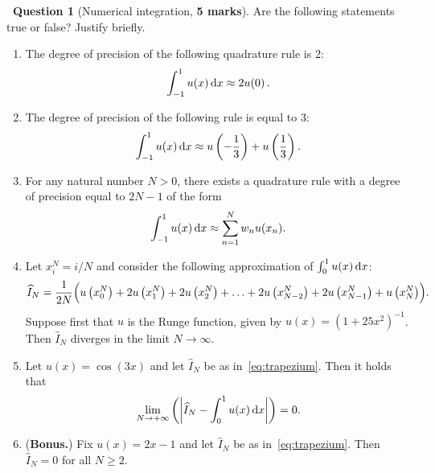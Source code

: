 \documentclass[10pt]{article}
\theoremstyle{definition}
\newtheorem{question}{{\normalfont \faGears}~Question}
\theoremstyle{remark}
\renewcommand{\mymarks}[1]{\textbf{#1 marks}}
\begin{document}
\begin{question}
    [Numerical integration, \mymarks{5}]
    Are the following statements true or false?
    Justify briefly.
    \begin{enumerate}
        \item
            The degree of precision of the following quadrature rule is 2:
            \[
                \int_{-1}^{1} u(x) \, \mathrm d x \approx 2u(0) \, .
            \]

        \item
            The degree of precision of the following rule is equal to 3:
            \[
                \int_{-1}^{1} u(x) \, \mathrm d x \approx u \left(-\frac{1}{3}\right) + u \left(\frac{1}{3}\right).
            \]

        \item
            For any natural number $N > 0$,
            there exists a quadrature rule with a degree of precision equal to $2N - 1$ of the form
            \[
                \int_{-1}^{1} u(x) \, \mathrm d x \approx
                \sum_{n=1}^{N} w_n u(x_n).
            \]

        \item
            Let $x^N_i = i/N$ and consider the following approximation of $\int_{0}^{1} u(x) \, \mathrm d x$:
            \begin{equation}
                \label{eq:trapezium}
                \widehat I_N = \frac{1}{2N} \Bigl( u\left(x^N_0\right) + 2 u\left(x^N_1\right) + 2 u\left(x^N_2\right) + \dotsc + 2 u\left(x^N_{N-2}\right) + 2 u\left(x^N_{N-1}\right) + u\left(x^N_N\right) \Bigr).
            \end{equation}
            Suppose first that $u$ is the Runge function, given by $u(x) = (1 + 25 x^2)^{-1}$.
            Then $\widehat I_N$ diverges in the limit $N \to \infty$.

        \item
            Let $u(x) = \cos(3x)$ and let $\widehat I_N$ be as in~\eqref{eq:trapezium}.
            Then it holds that
            \[
                \lim_{N \to +\infty}
                \left( \left\lvert \widehat I_N - \int_{0}^1 u(x) \, \mathrm d x \right\rvert \right) = 0.
            \]

        \item
            (\textbf{Bonus.})
            Fix $u(x) = 2x - 1$ and let $\widehat I_N$ be as in~\eqref{eq:trapezium}.
            Then $\widehat I_N = 0$ for all $N \geq 2$.
    \end{enumerate}
\end{question}
\end{document}
